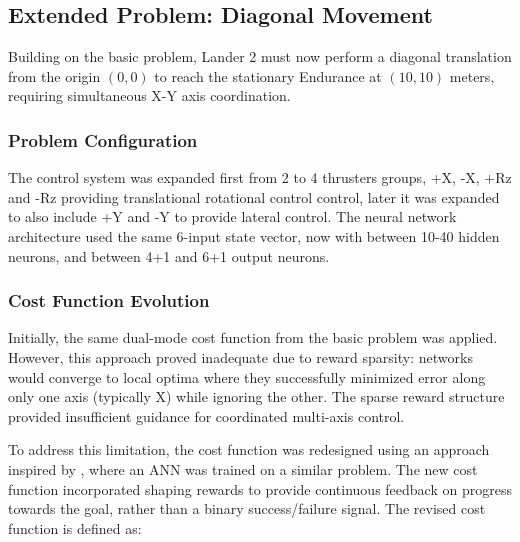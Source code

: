 \subsection{Extended Problem: Diagonal Movement}

Building on the basic problem, Lander 2 must now perform a diagonal translation
from the origin $(0, 0)$ to reach the stationary Endurance at $(10, 10)$ meters,
requiring simultaneous X-Y axis coordination.

\subsubsection{Problem Configuration}

The control system was expanded first from 2 to 4 thrusters groups, +X, -X, +Rz
and -Rz providing translational rotational control control, later it was
expanded to also include +Y and -Y to provide lateral control. The neural
network architecture used the same 6-input state vector, now with between 10-40
hidden neurons, and between 4+1 and 6+1 output neurons.

\subsubsection{Cost Function Evolution}

Initially, the same dual-mode cost function from the basic problem was applied. However, this approach proved inadequate due to reward sparsity: networks would converge to local optima where they successfully minimized error along only one axis (typically X) while ignoring the other. The sparse reward structure provided insufficient guidance for coordinated multi-axis control.

To address this limitation, the cost function was redesigned using an approach inspired by \cite{park2017nonlinear}, where an ANN was trained on a similar problem.
The new cost function incorporated shaping rewards to provide continuous feedback on progress towards the goal, rather than a binary success/failure signal. The revised cost function is defined as:

